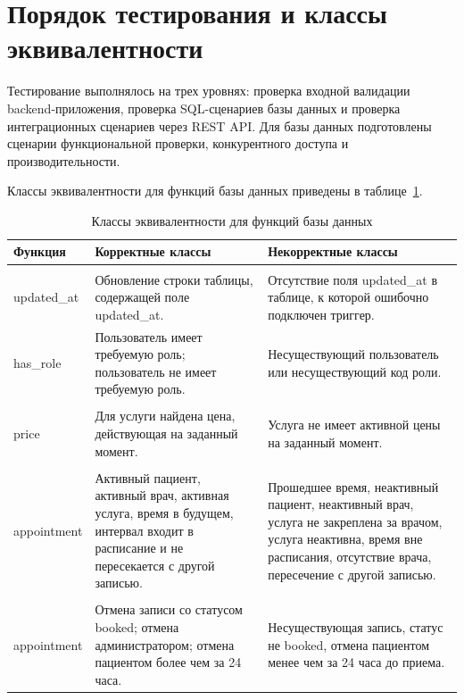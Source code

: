 \section{Порядок тестирования и классы эквивалентности}

Тестирование выполнялось на трех уровнях: проверка входной валидации backend-приложения, проверка SQL-сценариев базы данных и проверка интеграционных сценариев через REST API. Для базы данных подготовлены сценарии функциональной проверки, конкурентного доступа и производительности.

Классы эквивалентности для функций базы данных приведены в таблице~\ref{tab:equivalence-classes}.

\begin{table}[H]
    \centering
    \caption{Классы эквивалентности для функций базы данных}
    \label{tab:equivalence-classes}
    \scriptsize
    \renewcommand{\arraystretch}{1.08}
    \begin{tabularx}{\textwidth}{|>{\raggedright\arraybackslash}p{3.5cm}|>{\raggedright\arraybackslash}X|>{\raggedright\arraybackslash}X|}
        \hline
        Функция & Корректные классы & Некорректные классы \tabularnewline
        \hline
        \begin{tabular}[t]{@{}l@{}}set\_\tabularnewline updated\_at\end{tabular} & Обновление строки таблицы, содержащей поле updated\_at. & Отсутствие поля updated\_at в таблице, к которой ошибочно подключен триггер. \tabularnewline
        \hline
        has\_role & Пользователь имеет требуемую роль; пользователь не имеет требуемую роль. & Несуществующий пользователь или несуществующий код роли. \tabularnewline
        \hline
        \begin{tabular}[t]{@{}l@{}}get\_service\_\tabularnewline price\end{tabular} & Для услуги найдена цена, действующая на заданный момент. & Услуга не имеет активной цены на заданный момент. \tabularnewline
        \hline
        \begin{tabular}[t]{@{}l@{}}book\_\tabularnewline appointment\end{tabular} & Активный пациент, активный врач, активная услуга, время в будущем, интервал входит в расписание и не пересекается с другой записью. & Прошедшее время, неактивный пациент, неактивный врач, услуга не закреплена за врачом, услуга неактивна, время вне расписания, отсутствие врача, пересечение с другой записью. \tabularnewline
        \hline
        \begin{tabular}[t]{@{}l@{}}cancel\_\tabularnewline appointment\end{tabular} & Отмена записи со статусом booked; отмена администратором; отмена пациентом более чем за 24 часа. & Несуществующая запись, статус не booked, отмена пациентом менее чем за 24 часа до приема. \tabularnewline

\end{tabularx}
\end{table}
